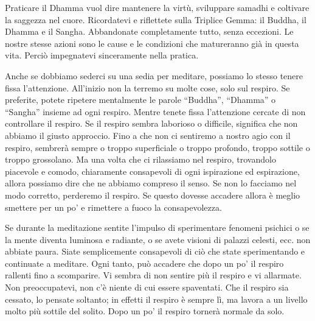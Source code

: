 Praticare il Dhamma vuol dire mantenere la virtù, sviluppare samadhi e
coltivare la saggezza nel cuore. Ricordatevi e riflettete sulla Triplice
Gemma: il Buddha, il Dhamma e il Sangha. Abbandonate completamente
tutto, senza eccezioni. Le nostre stesse azioni sono le cause e le
condizioni che matureranno già in questa vita. Perciò impegnatevi
sinceramente nella pratica.

Anche se dobbiamo sederci su una sedia per meditare, possiamo lo stesso
tenere fissa l'attenzione. All'inizio non la terremo su molte cose, solo
sul respiro. Se preferite, potete ripetere mentalmente le parole
``Buddha'', ``Dhamma'' o ``Sangha'' insieme ad ogni respiro. Mentre
tenete fissa l'attenzione cercate di non controllare il respiro. Se il
respiro sembra laborioso o difficile, significa che non abbiamo il
giusto approccio. Fino a che non ci sentiremo a nostro agio con il
respiro, sembrerà sempre o troppo superficiale o troppo profondo, troppo
sottile o troppo grossolano. Ma una volta che ci rilassiamo nel respiro,
trovandolo piacevole e comodo, chiaramente consapevoli di ogni
ispirazione ed espirazione, allora possiamo dire che ne abbiamo compreso
il senso. Se non lo facciamo nel modo corretto, perderemo il respiro. Se
questo dovesse accadere allora è meglio smettere per un po' e rimettere
a fuoco la consapevolezza.

Se durante la meditazione sentite l'impulso di sperimentare fenomeni
psichici o se la mente diventa luminosa e radiante, o se avete visioni
di palazzi celesti, ecc. non abbiate paura. Siate semplicemente
consapevoli di ciò che state sperimentando e continuate a meditare. Ogni
tanto, può accadere che dopo un po' il respiro rallenti fino a
scomparire. Vi sembra di non sentire più il respiro e vi allarmate. Non
preoccupatevi, non c'è niente di cui essere spaventati. Che il respiro
sia cessato, lo pensate soltanto; in effetti il respiro è sempre lì, ma
lavora a un livello molto più sottile del solito. Dopo un po' il respiro
tornerà normale da solo.

